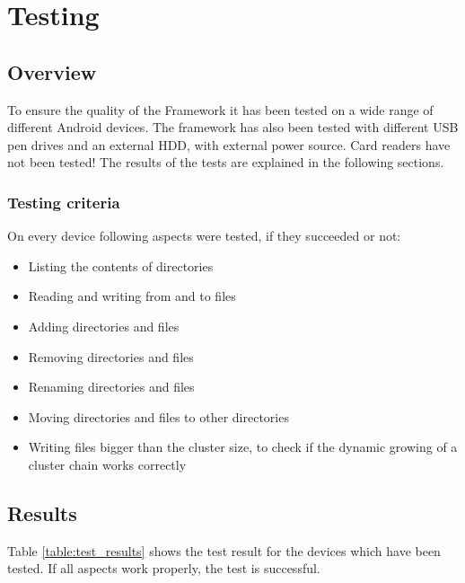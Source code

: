 \chapter{Testing}

\section{Overview}

To ensure the quality of the Framework it has been tested on a wide range of different Android devices. The framework has also been tested with different USB pen drives and an external HDD, with external power source. Card readers have not been tested! The results of the tests are explained in the following sections.

\subsection{Testing criteria}

On every device following aspects were tested, if they succeeded or not:

\begin{itemize}
\item Listing the contents of directories
\item Reading and writing from and to files
\item Adding directories and files
\item Removing directories and files
\item Renaming directories and files
\item Moving directories and files to other directories
\item Writing files bigger than the cluster size, to check if the dynamic growing of a cluster chain works correctly
\end{itemize}

\section{Results}

Table \ref{table:test_results} shows the test result for the devices which have been tested. If all aspects work properly, the test is successful.

